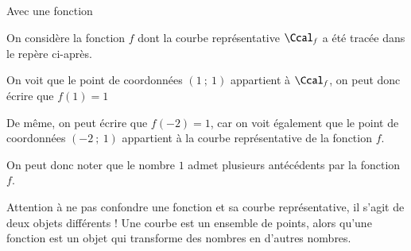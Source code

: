 \documentclass[oneside,12pt]{article}          %
\begin{document}
\begin{exemple}{Avec une fonction}
	\begin{minipage}{0.5\linewidth} \restoreskip
		On considère la fonction $f$ dont la courbe représentative $\Ccal_f$ a été tracée dans le repère ci-après.
		
		On voit que le point de coordonnées $(1~;~1)$ appartient à $\Ccal_f$, on peut donc écrire que $f(1)=1$
		
		De même, on peut écrire que $f(-2)=1$, car on voit également que le point de coordonnées $(-2~;~1)$ appartient à la courbe représentative de la fonction $f$.
		
		On peut donc noter que le nombre $1$ admet plusieurs antécédents par la fonction $f$.
		
	\end{minipage} \hspace{3mm}
	\begin{minipage}{0.4\linewidth}
	\end{minipage}
\end{exemple}


\begin{remarque}
	Attention à ne pas confondre une fonction et sa courbe représentative, il s'agit de deux objets différents ! Une courbe est un ensemble de points, alors qu'une fonction est un objet qui transforme des nombres en d'autres nombres.
\end{remarque}
\end{document}
